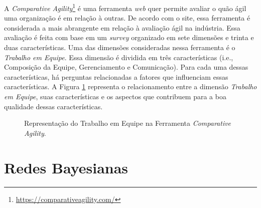 A \textit{Comparative Agility}\footnote{\url{https://comparativeagility.com/}} é uma ferramenta \textit{web} quer permite avaliar o quão ágil uma organização é em relação à outras. De acordo com o site, essa ferramenta é considerada a mais abrangente em relação à avaliação ágil na indústria. Essa avaliação é feita com base em um \textit{survey} organizado em sete dimensões e trinta e duas características. Uma das dimensões consideradas nessa ferramenta é o \textit{Trabalho em Equipe}. Essa dimensão é dividida em três características (i.e., Composição da Equipe, Gerenciamento e Comunicação). Para cada uma dessas características, há perguntas relacionadas a fatores que influenciam essas características. A Figura \ref{fundamentacao:ageis:fatores:comparativeagility} representa o relacionamento entre a dimensão \textit{Trabalho em Equipe}, suas características e os aspectos que contribuem para a boa qualidade dessas características.

\begin{figure}[H]
\begin{center}
    \end{center}
    \caption{Representação do Trabalho em Equipe na Ferramenta \textit{Comparative Agility}.}
    \label{fundamentacao:ageis:fatores:comparativeagility}
\end{figure}

\section{Redes Bayesianas}
\label{fundamentacao:redes}

